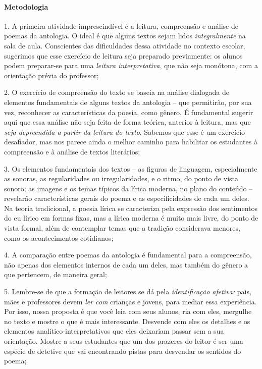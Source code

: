 \documentclass[11pt]{extarticle}
\begin{document}
\paragraph{Metodologia}

1. A primeira atividade imprescindível é a leitura, compreensão e
análise de poemas da antologia. O ideal é que alguns textos sejam lidos
\emph{integralmente} na sala de aula. Conscientes das dificuldades dessa
atividade no contexto escolar, sugerimos que esse exercício de leitura
seja preparado previamente: os alunos podem preparar-se para uma
\emph{leitura interpretativa}, que não seja monótona, com a orientação
prévia do professor;

2. O exercício de compreensão do texto se baseia na análise dialogada de
elementos fundamentais de alguns textos da antologia -- que permitirão,
por sua vez, reconhecer as características da poesia, como gênero. É
fundamental sugerir aqui que essa análise não seja feita de forma
teórica, anterior à leitura, mas que \emph{seja depreendida a partir da
leitura do texto}. Sabemos que esse é um exercício desafiador, mas nos
parece ainda o melhor caminho para habilitar os estudantes à compreensão
e à análise de textos literários;

3. Os elementos fundamentais dos textos -- as figuras de linguagem,
especialmente as sonoras, as regularidades ou irregularidades, e o
ritmo, do ponto de vista sonoro; as imagens e os temas típicos da lírica
moderna, no plano do conteúdo -- revelarão características gerais do
poema e as especificidades de cada um deles. Na teoria tradicional, a
poesia lírica se caracteriza pela expressão dos sentimentos do eu lírico
em formas fixas, mas a lírica moderna é muito mais livre, do ponto de
vista formal, além de contemplar temas que a tradição considerava
menores, como os acontecimentos cotidianos;

4. A comparação entre poemas da antologia é fundamental para a
compreensão, não apenas dos elementos internos de cada um deles, mas
também do gênero a que pertencem, de maneira geral;

5. Lembre-se de que a formação de leitores se dá pela
\emph{identificação afetiva:} pais, mães e professores devem \emph{ler
com} crianças e jovens, para mediar essa experiência. Por isso, nossa
proposta é que você leia com seus alunos, ria com eles, mergulhe no
texto e mostre o que é mais interessante. Desvende com eles os detalhes
e os elementos analítico-interpretativos que eles deixariam passar sem a
sua orientação. Mostre a seus estudantes que um dos prazeres do leitor é
ser uma espécie de detetive que vai encontrando pistas para desvendar os
sentidos do poema;
\end{document}
